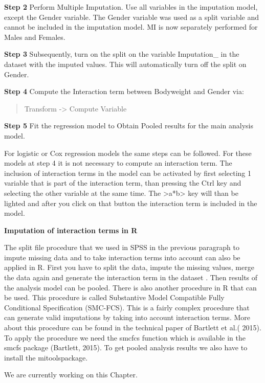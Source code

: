 \documentclass[
]{book}
\begin{document}
\textbf{Step 2}
Perform Multiple Imputation. Use all variables in the imputation model, except the Gender variable. The Gender variable was used as a split variable and cannot be included in the imputation model. MI is now separately performed for Males and Females.

\textbf{Step 3}
Subsequently, turn on the split on the variable Imputation\_ in the dataset with the imputed values. This will automatically turn off the split on Gender.

\textbf{Step 4}
Compute the Interaction term between Bodyweight and Gender via:

\begin{quote}
Transform -\textgreater{} Compute Variable
\end{quote}

\textbf{Step 5}
Fit the regression model to Obtain Pooled results for the main analysis model.

For logistic or Cox regression models the same steps can be followed. For these models at step 4 it is not necessary to compute an interaction term. The inclusion of interaction terms in the model can be activated by first selecting 1 variable that is part of the interaction term, than pressing the Ctrl key and selecting the other variable at the same time. The \textgreater a*b\textgreater{} key will than be lighted and after you click on that button the interaction term is included in the model.

\textbf{Imputation of interaction terms in R}

The split file procedure that we used in SPSS in the previous paragraph to impute missing data and to take interaction terms into account can also be applied in R. First you have to split the data, impute the missing values, merge the data again and generate the interaction term in the dataset . Then results of the analysis model can be pooled.
There is also another procedure in R that can be used. This procedure is called Substantive Model Compatible Fully Conditional Specification (SMC-FCS). This is a fairly complex procedure that can generate valid imputations by taking into account interaction terms. More about this procedure can be found in the technical paper of Bartlett et al.( 2015). To apply the procedure we need the smcfcs function which is available in the smcfs package (Bartlett, 2015). To get pooled analysis results we also have to install the mitoolspackage.

We are currently working on this Chapter.
\end{document}
